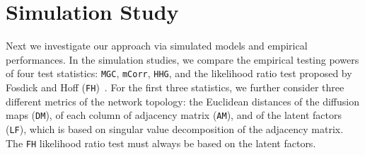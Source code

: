 \documentclass[11pt]{article}
\theoremstyle{definition}
\newtheorem{theorem}{Theorem}[section]
\newcommand{\cs}[1]{\textcolor{blue}{cs: #1}}
\begin{document}



\section{Simulation Study}
\label{sec:simulation}
	\vspace*{-0.2cm}
Next we investigate our approach via simulated models and empirical performances. In the simulation studies, we compare the empirical testing powers of four test statistics: \texttt{MGC}, \texttt{mCorr}, \texttt{HHG}, and the likelihood ratio test proposed by Fosdick and Hoff (\texttt{FH})~\cite{fosdick2015testing}. For the first three statistics, we further consider three different metrics of the network topology: the Euclidean distances of the diffusion maps (\texttt{DM}), of each column of adjacency matrix (\texttt{AM}), and of the latent factors (\texttt{LF}), which is based on singular value decomposition of the adjacency matrix. The \texttt{FH} likelihood ratio test must always be based on the latent factors.
\end{document}
